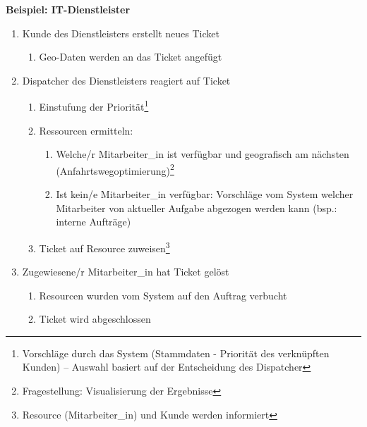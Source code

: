 \documentclass[Bachelorarbeit.tex]{subfiles}
\begin{document}
\textbf{Beispiel: IT-Dienstleister}
\begin{enumerate}
	\item Kunde des Dienstleisters erstellt neues Ticket
		\begin{enumerate}
			\item Geo-Daten werden an das Ticket angefügt
		\end{enumerate}
	\item Dispatcher des Dienstleisters reagiert auf Ticket
		\begin{enumerate}
			\item Einstufung der Priorität\footnote{Vorschläge durch das System (Stammdaten - Priorität des verknüpften Kunden) – Auswahl basiert auf der Entscheidung des Dispatcher}
			\item Ressourcen ermitteln:
			\begin{enumerate}
				\item Welche/r Mitarbeiter\_in ist verfügbar und geografisch am nächsten (Anfahrtswegoptimierung)\footnote{Fragestellung: Visualisierung der Ergebnisse }
				\item Ist kein/e Mitarbeiter\_in verfügbar: Vorschläge vom System welcher Mitarbeiter von aktueller Aufgabe abgezogen werden kann (bsp.: interne Aufträge)
			\end{enumerate}
			\item Ticket auf Resource zuweisen\footnote{Resource (Mitarbeiter\_in) und Kunde werden informiert}
		\end{enumerate}
	\item Zugewiesene/r Mitarbeiter\_in hat Ticket gelöst
	\begin{enumerate}
		\item Resourcen wurden vom System auf den Auftrag verbucht
		\item Ticket wird abgeschlossen
	\end{enumerate}
\end{enumerate}
\end{document}
